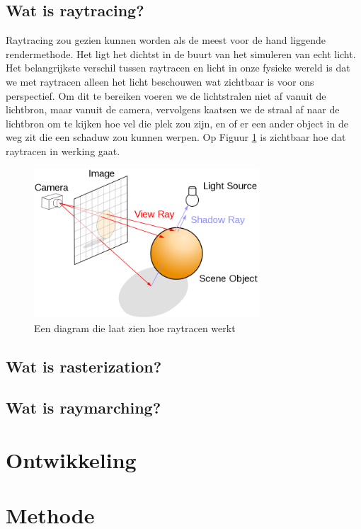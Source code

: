 \documentclass[12pt, a4paper]{article}
\begin{document}
\subsection{Wat is raytracing?}

Raytracing zou gezien kunnen worden als de meest voor de hand liggende rendermethode. Het ligt het dichtst in de buurt van het simuleren van echt licht. Het belangrijkste verschil tussen raytracen en licht in onze fysieke wereld is dat we met raytracen alleen het licht beschouwen wat zichtbaar is voor ons perspectief. Om dit te bereiken voeren we de lichtstralen niet af vanuit de lichtbron, maar vanuit de camera, vervolgens kaatsen we de straal af naar de lichtbron om te kijken hoe vel die plek zou zijn, en of er een ander object in de weg zit die een schaduw zou kunnen werpen. Op Figuur \ref{fig:raytracing_diagram} is zichtbaar hoe dat raytracen in werking gaat.

\begin{figure}[h]
    \centering
    \includegraphics[width=0.75\textwidth]{raytracing_diagram.png}
    \caption{Een diagram die laat zien hoe raytracen werkt}
    \label{fig:raytracing_diagram}
\end{figure}
\subsection{Wat is rasterization?}
\subsection{Wat is raymarching?}
\clearpage
\section{Ontwikkeling}
\clearpage
\section{Methode}
\clearpage
\end{document}
